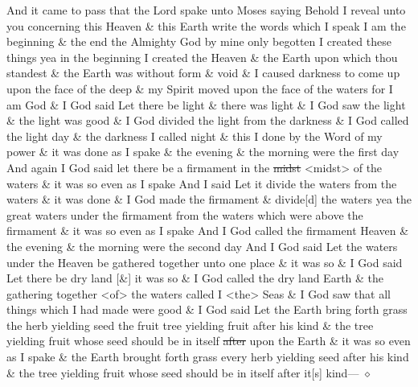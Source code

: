 		And it came to pass that the Lord spake unto Moses saying Behold I reveal unto you concerning this Heaven \& this Earth write the words which I speak I am the beginning \& the end the Almighty God by mine only begotten I created these things yea in the beginning I created the Heaven \& the Earth upon which thou standest \& the Earth was without form \& void \& I caused darkness to come up upon the face of the deep \& my Spirit moved upon the face of the waters for I am God \& I God said Let there be light \& there was light \& I God saw the light \& the light was good \& I God divided the light from the darkness \& I God called the light day \& the darkness I called night \& this I done by the Word of my power \& it was done as I spake \& the evening \& the morning were the first day And again I God said let there be a firmament in the \sout{midst} <midst> of the waters \& it was so even as I spake And I said Let it divide the waters from the waters \& it was done \& I God made the firmament \& divide[d] the waters yea the great waters under the firmament from the waters which were above the firmament \& it was so even as I spake And I God called the firmament Heaven \& the evening \& the morning were the second day And I God said Let the waters under the Heaven be gathered together unto one place \& it was so \& I God said Let there be dry land [\&] it was so \& I God called the dry land Earth \& the gathering together <of> the waters called I <the> Seas \& I God saw that all things which I had made were good \& I God said Let the Earth bring forth grass the herb yielding seed the fruit tree yielding fruit after his kind \& the tree yielding fruit whose seed should be in itself \sout{after} upon the Earth \& it was so even as I spake \& the Earth brought forth grass every herb yielding seed after his kind \& the tree yielding fruit whose seed should be in itself after it[s] kind--- $\diamond$
		
